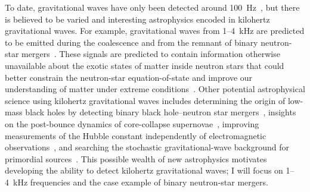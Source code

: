To date, gravitational waves have only been detected around 100~Hz~\cite{GWTC-1:2018,GWTC-2:2020}, but there is believed to be varied and interesting astrophysics encoded in kilohertz gravitational waves.
For example, gravitational waves from 1--4~kHz are predicted to be emitted during the coalescence and from the remnant of binary neutron-star mergers~\cite{PhysRevD.100.104029}.
These signals are predicted to contain information otherwise unavailable about the exotic states of matter inside neutron stars that could better constrain the neutron-star equation-of-state and improve our understanding of matter under extreme conditions~\cite{PhysRevD.100.104029,miaoDesignGravitationalWaveDetectors2018}. %
Other potential astrophysical science using kilohertz gravitational waves includes determining the origin of low-mass black holes by detecting binary black hole--neutron star mergers~\cite{PhysRevD.79.044030}, insights on the post-bounce dynamics of core-collapse supernovae~\cite{Ott_2009}, improving measurements of the Hubble constant independently of electromagnetic observations~\cite{PhysRevX.4.041004}, and searching the stochastic gravitational-wave background for primordial sources~\cite{miaoDesignGravitationalWaveDetectors2018}.
This possible wealth of new astrophysics motivates developing the ability to detect kilohertz gravitational waves; I will focus on 1--4~kHz frequencies and the case example of binary neutron-star mergers.



